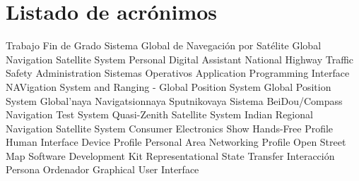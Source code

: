 \chapter{Listado de acrónimos}

{\small
\begin{acronym}[XXXXXXXX]
       {Trabajo Fin de Grado}
      {Sistema Global de Navegación por Satélite}
      {Global Navigation Satellite System}
       {Personal Digital Assistant}
     {National Highway Traffic Safety Administration}
        {Sistemas Operativos}
       {Application Programming Interface}
   {NAVigation System and Ranging - Global Position System}
       {Global Position System}
   {Global'naya Navigatsionnaya Sputnikovaya Sistema}
      {BeiDou/Compass Navigation Test System}
      {Quasi-Zenith Satellite System} 
     {Indian Regional Navigation Satellite System}
       {Consumer Electronics Show}
       {Hands-Free Profile}
       {Human Interface Device Profile}
       {Personal Area Networking Profile}
       {Open Street Map}
       {Software Development Kit}
      {Representational State Transfer}
       {Interacción Persona Ordenador}
       {Graphical User Interface}
\end{acronym}
}




